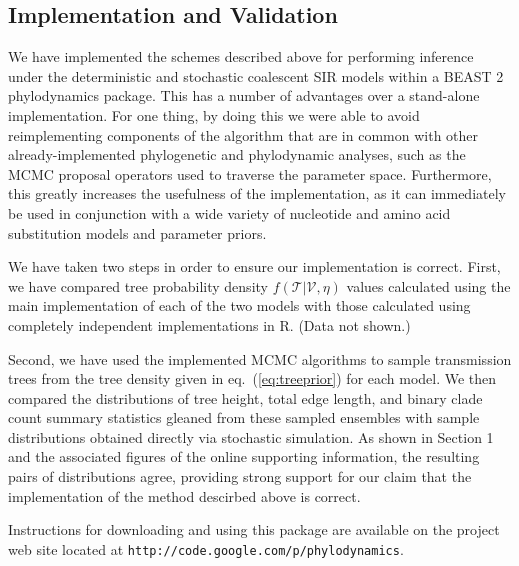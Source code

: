 \documentclass[12pt,titlepage]{article}
\newcommand{\traj}{\mathcal{V}}
\newcommand{\tree}{\mathcal{T}}
\newcommand{\BDSIR}{BDSIR}
\begin{document}
\subsection{Implementation and Validation}

We have implemented the schemes described above for performing
inference under the deterministic and stochastic coalescent SIR
models within a BEAST 2 phylodynamics package. This has a number of advantages over a
stand-alone implementation. For one thing, by doing this we were able to
avoid reimplementing components of the algorithm that are in common
with other already-implemented phylogenetic and phylodynamic analyses,
such as the MCMC proposal operators used to traverse the parameter
space.  Furthermore, this greatly increases the usefulness of the
implementation, as it can immediately be used in conjunction with a
wide variety of nucleotide and amino acid substitution models and
parameter priors.

We have taken two steps in order to ensure our implementation
is correct. First, we have compared tree probability density
$f(\tree|\traj, \eta)$ values calculated using the main implementation
of each of the two models with those calculated using completely
independent implementations in R.  (Data not shown.)

Second, we have used the implemented MCMC algorithms to sample
transmission trees from the tree density given in
eq.~(\ref{eq:treeprior}) for each model. We then compared the
distributions of tree height, total edge length, and binary clade count
summary statistics gleaned from these sampled ensembles with sample
distributions obtained directly via
stochastic simulation.  As shown in Section 1 and the associated
figures of the online supporting information, the resulting pairs of
distributions agree, providing strong support for our claim that the
implementation of the method descirbed above is correct.

Instructions for downloading and using this package are available on
the project web site located at
\texttt{http://code.google.com/p/phylodynamics}.


\end{document}
